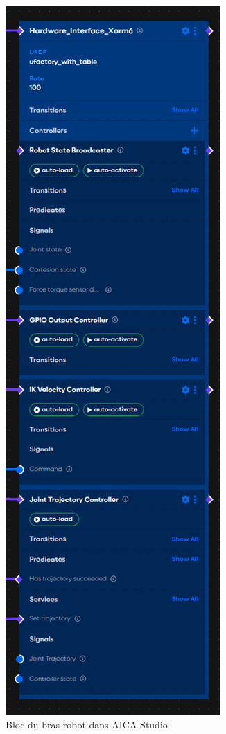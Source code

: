 \begin{figure}[H]
    \centering
    \includegraphics[height=0.8\textheight,keepaspectratio]{assets/figures/AICA_Hardware_interface.png}
    \caption{Bloc du bras robot dans AICA Studio}
    \label{fig:robot_block}
\end{figure}

